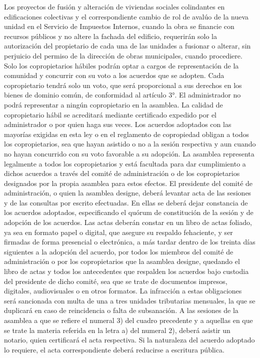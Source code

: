     Los proyectos de fusión y alteración de viviendas sociales colindantes en edificaciones colectivas y el correspondiente cambio de rol de avalúo de la nueva unidad en el Servicio de Impuestos Internos, cuando la obra se financie con recursos públicos y no altere la fachada del edificio, requerirán solo la autorización del propietario de cada una de las unidades a fusionar o alterar, sin perjuicio del permiso de la dirección de obras municipales, cuando procediere.
    Solo los copropietarios hábiles podrán optar a cargos de representación de la comunidad y concurrir con su voto a los acuerdos que se adopten. Cada copropietario tendrá solo un voto, que será proporcional a sus derechos en los bienes de dominio común, de conformidad al artículo 3°. El administrador no podrá representar a ningún copropietario en la asamblea. La calidad de copropietario hábil se acreditará mediante certificado expedido por el administrador o por quien haga sus veces.
    Los acuerdos adoptados con las mayorías exigidas en esta ley o en el reglamento de copropiedad obligan a todos los copropietarios, sea que hayan asistido o no a la sesión respectiva y aun cuando no hayan concurrido con su voto favorable a su adopción. La asamblea representa legalmente a todos los copropietarios y está facultada para dar cumplimiento a dichos acuerdos a través del comité de administración o de los copropietarios designados por la propia asamblea para estos efectos.
    El presidente del comité de administración, o quien la asamblea designe, deberá levantar acta de las sesiones y de las consultas por escrito efectuadas. En ellas se deberá dejar constancia de los acuerdos adoptados, especificando el quórum de constitución de la sesión y de adopción de los acuerdos.
    Las actas deberán constar en un libro de actas foliado, ya sea en formato papel o digital, que asegure su respaldo fehaciente, y ser firmadas de forma presencial o electrónica, a más tardar dentro de los treinta días siguientes a la adopción del acuerdo, por todos los miembros del comité de administración o por los copropietarios que la asamblea designe, quedando el libro de actas y todos los antecedentes que respalden los acuerdos bajo custodia del presidente de dicho comité, sea que se trate de documentos impresos, digitales, audiovisuales o en otros formatos. La infracción a estas obligaciones será sancionada con multa de una a tres unidades tributarias mensuales, la que se duplicará en caso de reincidencia o falta de subsanación.
    A las sesiones de la asamblea a que se refiere el numeral 3) del cuadro precedente y a aquellas en que se trate la materia referida en la letra a) del numeral 2), deberá asistir un notario, quien certificará el acta respectiva. Si la naturaleza del acuerdo adoptado lo requiere, el acta correspondiente deberá reducirse a escritura pública.

